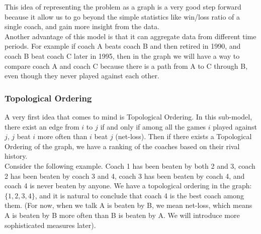 \documentclass[titlepage]{article}
\begin{document}
\noindent This idea of representing the problem as a graph is a very good step forward because it allow us to go beyond the simple statistics like win/loss ratio of a single coach, and gain more insight from the data.
\\

\noindent Another advantage of this model is that it can aggregate data from different time periods. For example if coach A beats coach B and then retired in 1990, and coach B beat coach C later in 1995, then in the graph we will have a way to compare coach A and coach C because there is a path from A to C through B, even though they never played against each other.

\subsubsection{Topological Ordering}
A very first idea that comes to mind is Topological Ordering. In this sub-model, there exist an edge from $i$ to $j$ if and only if among all the games $i$ played against $j$, $j$ beat $i$ more often than $i$ beat $j$ (net-loss). Then if there exists a Topological Ordering of the graph, we have a ranking of the coaches based on their rival history.
\\

\noindent Consider the following example. Coach 1 has been beaten by both 2 and 3, coach 2 has been beaten by coach 3 and 4, coach 3 has been beaten by coach 4, and coach 4 is never beaten by anyone. We have a topological ordering in the graph: $\{1, 2, 3, 4\}$, and it is natural to conclude that coach 4 is the best coach among them. (For now, when we talk A is beaten by B, we mean net-loss, which means A is beaten by B more often than B is beaten by A. We will introduce more sophisticated measures later).

\begin{center}
\end{center}
\end{document}
